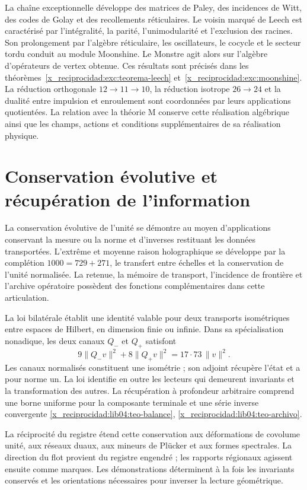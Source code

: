 La chaîne exceptionnelle développe des matrices de Paley, des incidences de Witt, des codes de Golay et des recollements réticulaires. Le voisin marqué de Leech est caractérisé par l’intégralité, la parité, l’unimodularité et l’exclusion des racines. Son prolongement par l’algèbre réticulaire, les oscillateurs, le cocycle et le secteur tordu conduit au module Moonshine. Le Monstre agit alors sur l’algèbre d’opérateurs de vertex obtenue. Ces résultats sont précisés dans les théorèmes~\ref{x_reciprocidad:exc:teorema-leech} et~\ref{x_reciprocidad:exc:moonshine}. La réduction orthogonale \(12\to11\to10\), la réduction isotrope \(26\to24\) et la dualité entre impulsion et enroulement sont coordonnées par leurs applications quotientées. La relation avec la théorie M conserve cette réalisation algébrique ainsi que les champs, actions et conditions supplémentaires de sa réalisation physique.

\section*{Conservation évolutive et récupération de l’information}

La conservation évolutive de l’unité se démontre au moyen d’applications conservant la mesure ou la norme et d’inverses restituant les données transportées. L’extrême et moyenne raison holographique se développe par la complétion \(1000=729+271\), le transfert entre échelles et la conservation de l’unité normalisée. La retenue, la mémoire de transport, l’incidence de frontière et l’archive opératoire possèdent des fonctions complémentaires dans cette articulation.

La loi bilatérale établit une identité valable pour deux transports isométriques entre espaces de Hilbert, en dimension finie ou infinie. Dans sa spécialisation nonadique, les deux canaux \(Q_-\) et \(Q_+\) satisfont
\[
 9\|Q_-v\|^2+8\|Q_+v\|^2
 =17\cdot73\,\|v\|^2.
\]
Les canaux normalisés constituent une isométrie ; son adjoint récupère l’état et a pour norme un. La loi identifie en outre les lecteurs qui demeurent invariants et la transformation des autres. La récupération à profondeur arbitraire comprend une borne uniforme pour la composante terminale et une série inverse convergente \ref{x_reciprocidad:lib04:teo-balance}, \ref{x_reciprocidad:lib04:teo-archivo}.

La réciprocité du registre étend cette conservation aux déformations de covolume unité, aux réseaux duaux, aux mineurs de Plücker et aux formes spectrales. La direction du flot provient du registre engendré ; les rapports régionaux agissent ensuite comme marques. Les démonstrations déterminent à la fois les invariants conservés et les orientations nécessaires pour inverser la lecture géométrique.

